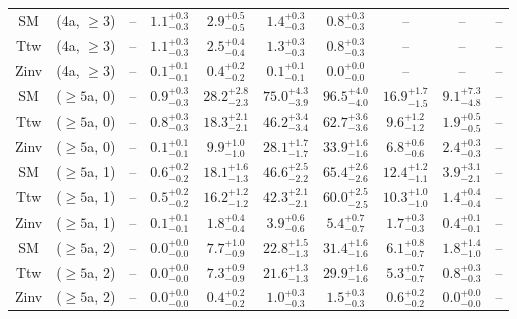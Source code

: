 \begin{table}[h!]
{\begin{tabular}{cccccccccc}
	SM & (4a, $\ge3$) & -- & $1.1^{+ 0.3 }_{- 0.3 }$ & $2.9^{+ 0.5 }_{- 0.5 }$ & $1.4^{+ 0.3 }_{- 0.3 }$ & $0.8^{+ 0.3 }_{- 0.3 }$ & -- & -- & -- \\[0.5ex] 
	Ttw & (4a, $\ge3$) & -- & $1.1^{+ 0.3 }_{- 0.3 }$ & $2.5^{+ 0.4 }_{- 0.4 }$ & $1.3^{+ 0.3 }_{- 0.3 }$ & $0.8^{+ 0.3 }_{- 0.3 }$ & -- & -- & -- \\[0.5ex] 
	Zinv & (4a, $\ge3$) & -- & $0.1^{+ 0.1 }_{- 0.1 }$ & $0.4^{+ 0.2 }_{- 0.2 }$ & $0.1^{+ 0.1 }_{- 0.1 }$ & $0.0^{+ 0.0 }_{- 0.0 }$ & -- & -- & -- \\[0.5ex] 
	SM & ($\ge5$a, 0) & -- & $0.9^{+ 0.3 }_{- 0.3 }$ & $28.2^{+ 2.8 }_{- 2.3 }$ & $75.0^{+ 4.3 }_{- 3.9 }$ & $96.5^{+ 4.0 }_{- 4.0 }$ & $16.9^{+ 1.7 }_{- 1.5 }$ & $9.1^{+ 7.3 }_{- 4.8 }$ & -- \\[0.5ex] 
	Ttw & ($\ge5$a, 0) & -- & $0.8^{+ 0.3 }_{- 0.3 }$ & $18.3^{+ 2.1 }_{- 2.1 }$ & $46.2^{+ 3.4 }_{- 3.4 }$ & $62.7^{+ 3.6 }_{- 3.6 }$ & $9.6^{+ 1.2 }_{- 1.2 }$ & $1.9^{+ 0.5 }_{- 0.5 }$ & -- \\[0.5ex] 
	Zinv & ($\ge5$a, 0) & -- & $0.1^{+ 0.1 }_{- 0.1 }$ & $9.9^{+ 1.0 }_{- 1.0 }$ & $28.1^{+ 1.7 }_{- 1.7 }$ & $33.9^{+ 1.6 }_{- 1.6 }$ & $6.8^{+ 0.6 }_{- 0.6 }$ & $2.4^{+ 0.3 }_{- 0.3 }$ & -- \\[0.5ex] 
	SM & ($\ge5$a, 1) & -- & $0.6^{+ 0.2 }_{- 0.2 }$ & $18.1^{+ 1.6 }_{- 1.3 }$ & $46.6^{+ 2.5 }_{- 2.2 }$ & $65.4^{+ 2.6 }_{- 2.6 }$ & $12.4^{+ 1.2 }_{- 1.1 }$ & $3.9^{+ 3.1 }_{- 2.1 }$ & -- \\[0.5ex] 
	Ttw & ($\ge5$a, 1) & -- & $0.5^{+ 0.2 }_{- 0.2 }$ & $16.2^{+ 1.2 }_{- 1.2 }$ & $42.3^{+ 2.1 }_{- 2.1 }$ & $60.0^{+ 2.5 }_{- 2.5 }$ & $10.3^{+ 1.0 }_{- 1.0 }$ & $1.4^{+ 0.4 }_{- 0.4 }$ & -- \\[0.5ex] 
	Zinv & ($\ge5$a, 1) & -- & $0.1^{+ 0.1 }_{- 0.1 }$ & $1.8^{+ 0.4 }_{- 0.4 }$ & $3.9^{+ 0.6 }_{- 0.6 }$ & $5.4^{+ 0.7 }_{- 0.7 }$ & $1.7^{+ 0.3 }_{- 0.3 }$ & $0.4^{+ 0.1 }_{- 0.1 }$ & -- \\[0.5ex] 
	SM & ($\ge5$a, 2) & -- & $0.0^{+ 0.0 }_{- 0.0 }$ & $7.7^{+ 1.0 }_{- 0.9 }$ & $22.8^{+ 1.5 }_{- 1.3 }$ & $31.4^{+ 1.6 }_{- 1.6 }$ & $6.1^{+ 0.8 }_{- 0.7 }$ & $1.8^{+ 1.4 }_{- 1.0 }$ & -- \\[0.5ex] 
	Ttw & ($\ge5$a, 2) & -- & $0.0^{+ 0.0 }_{- 0.0 }$ & $7.3^{+ 0.9 }_{- 0.9 }$ & $21.6^{+ 1.3 }_{- 1.3 }$ & $29.9^{+ 1.6 }_{- 1.6 }$ & $5.3^{+ 0.7 }_{- 0.7 }$ & $0.8^{+ 0.3 }_{- 0.3 }$ & -- \\[0.5ex] 
	Zinv & ($\ge5$a, 2) & -- & $0.0^{+ 0.0 }_{- 0.0 }$ & $0.4^{+ 0.2 }_{- 0.2 }$ & $1.0^{+ 0.3 }_{- 0.3 }$ & $1.5^{+ 0.3 }_{- 0.3 }$ & $0.6^{+ 0.2 }_{- 0.2 }$ & $0.0^{+ 0.0 }_{- 0.0 }$ & -- \\[0.5ex] 

\end{tabular}}
\end{table}
